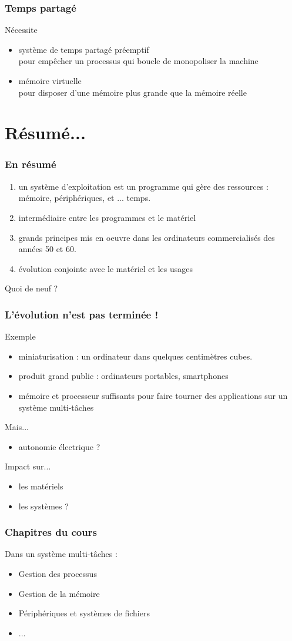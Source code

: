 \documentclass{beamer}
\begin{document}
\begin{frame}
\frametitle{Temps partagé}

Nécessite
\begin{itemize}
\item système de \alert{temps partagé préemptif}
\\
pour empêcher un processus qui boucle de monopoliser la machine
\item\alert{ mémoire virtuelle}
\\
pour disposer d'une mémoire plus grande que la mémoire réelle
\end{itemize}
\end{frame}

\section{Résumé...}

\begin{frame}
\frametitle{En résumé}

\begin{enumerate}
\item un \alert{système d'exploitation} est un programme qui gère des
  ressources : mémoire, périphériques, et ... temps.
\item intermédiaire entre les programmes et le matériel
\item grands principes mis en oeuvre dans les ordinateurs
  commercialisés des années 50 et 60.
\item évolution conjointe avec le matériel et les usages
\end{enumerate}
\vfill
\pause
Quoi de neuf ?
\end{frame}

\begin{frame}
\frametitle{
L'évolution n'est pas terminée !
}
Exemple
\begin{itemize}
\item \alert{miniaturisation} : un ordinateur dans quelques
centimètres cubes.
\item produit grand public : ordinateurs portables,  smartphones
\item mémoire et processeur suffisants pour faire tourner des
applications sur un 
\alert{système multi-tâches} 
\end{itemize}
\alert{Mais...} \pause
\begin{itemize}
\item autonomie électrique ?
\end{itemize}

\alert{Impact sur...}
\pause
\begin{itemize}
\item les matériels
\item les systèmes ?
\end{itemize}
\end{frame}

\begin{frame}
\frametitle{Chapitres du cours}

Dans un système multi-tâches :
\begin{itemize}
\item Gestion des processus 
\item Gestion de la mémoire 
\item Périphériques et systèmes de fichiers
\item ...
\end{itemize}
\end{frame}
\end{document}
